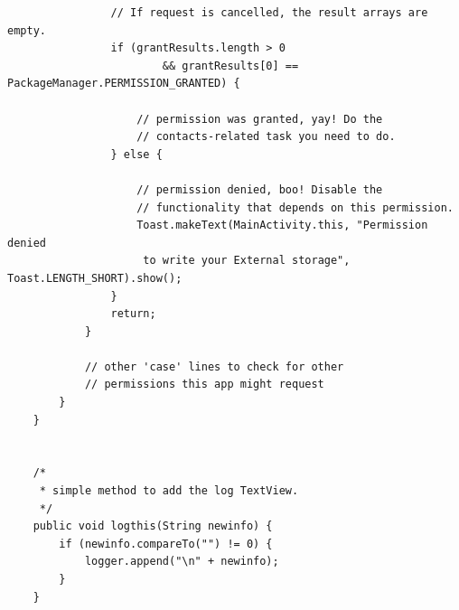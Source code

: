 \documentclass[12pt]{book}
\numberwithin{equation}{section}
\begin{document}
\begin{appendices}
\begin{verbatim}
                // If request is cancelled, the result arrays are empty.
                if (grantResults.length > 0
                        && grantResults[0] == PackageManager.PERMISSION_GRANTED) {

                    // permission was granted, yay! Do the
                    // contacts-related task you need to do.
                } else {

                    // permission denied, boo! Disable the
                    // functionality that depends on this permission.
                    Toast.makeText(MainActivity.this, "Permission denied
                     to write your External storage", Toast.LENGTH_SHORT).show();
                }
                return;
            }

            // other 'case' lines to check for other
            // permissions this app might request
        }
    }


    /*
     * simple method to add the log TextView.
     */
    public void logthis(String newinfo) {
        if (newinfo.compareTo("") != 0) {
            logger.append("\n" + newinfo);
        }
    }


\end{verbatim}
\end{appendices}
\end{document}
